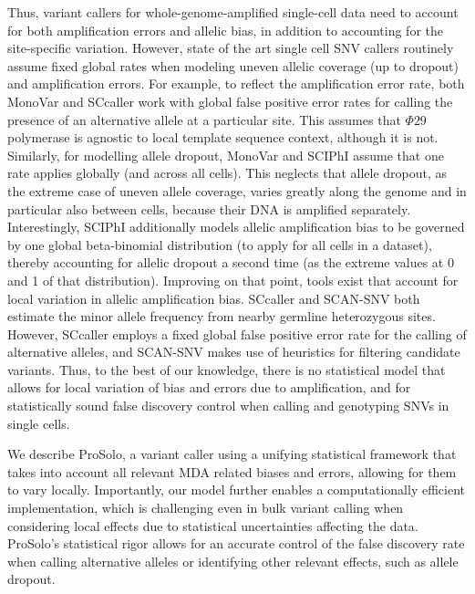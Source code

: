 \documentclass[12pt,inline]{wlscirep}
\begin{document}
Thus, variant callers for whole-genome-amplified single-cell data need to account for both amplification errors and allelic bias, in addition to accounting for the site-specific variation.
However, state of the art single cell SNV callers routinely assume fixed global rates when modeling uneven allelic coverage (up to dropout) and amplification errors. 
For example, to reflect the amplification error rate, both MonoVar\cite{zafar_monovar:_2016} and SCcaller\cite{dong_accurate_2017} work with global false positive error rates for calling the presence of an alternative allele at a particular site.
This assumes that $\Phi29$ polymerase is agnostic to local template sequence context, although it is not\cite{de_paz_high-resolution_2018}.
Similarly, for modelling allele dropout, MonoVar\cite{zafar_monovar:_2016} and SCIPhI\cite{singer_single-cell_2018} assume that one rate applies globally (and across all cells).
This neglects that allele dropout, as the extreme case of uneven allele coverage, varies greatly along the genome and in particular also between cells, because their DNA is amplified separately.
Interestingly, SCIPhI\cite{singer_single-cell_2018} additionally models allelic amplification bias to be governed by one global beta-binomial distribution (to apply for all cells in a dataset), thereby accounting for allelic dropout a second time (as the extreme values at 0 and 1 of that distribution).
Improving on that point, tools exist that account for local variation in allelic amplification bias. SCcaller \cite{dong_accurate_2017} and SCAN-SNV\cite{luquette_identification_2019} both estimate the minor allele frequency from nearby germline heterozygous sites. 
However, SCcaller employs a fixed global false positive error rate for the calling of alternative alleles\cite{dong_accurate_2017}, and SCAN-SNV makes use of heuristics for filtering candidate variants\cite{luquette_identification_2019}.
Thus, to the best of our knowledge, there is no statistical model that allows for local variation of bias and errors due to amplification, and for statistically sound false discovery control when calling and genotyping SNVs in single cells.

We describe ProSolo, a variant caller using a unifying statistical framework that takes into account all relevant MDA related biases and errors, allowing for them to vary locally.
Importantly, our model further enables a computationally efficient implementation, which is challenging even in bulk variant calling when considering local effects due to statistical uncertainties affecting the data\cite{koster_varlociraptor_2020}.
ProSolo's statistical rigor allows for an accurate control of the false discovery rate when calling alternative alleles or identifying other relevant effects, such as allele dropout.
\end{document}
